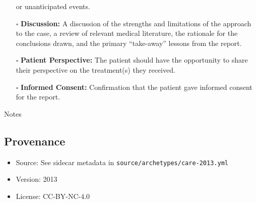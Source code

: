 \documentclass[11pt]{article}
\def\tightlist{}
\begin{document}
\begin{Form}
\begin{itemize}
  or unanticipated events.
\item[$\square$]
  \textbf{Discussion:} A discussion of the strengths and limitations of
  the approach to the case, a review of relevant medical literature, the
  rationale for the conclusions drawn, and the primary ``take-away''
  lessons from the report.
\item[$\square$]
  \textbf{Patient Perspective:} The patient should have the opportunity
  to share their perspective on the treatment(s) they received.
\item[$\square$]
  \textbf{Informed Consent:} Confirmation that the patient gave informed
  consent for the report.
\end{itemize}

{Notes}

\subsection{Provenance}\label{provenance}

\begin{itemize}
\tightlist
\item
  Source: See sidecar metadata in
  \texttt{source/archetypes/care-2013.yml}
\item
  Version: 2013
\item
  License: CC-BY-NC-4.0
\end{itemize}

\end{Form}
\end{document}
